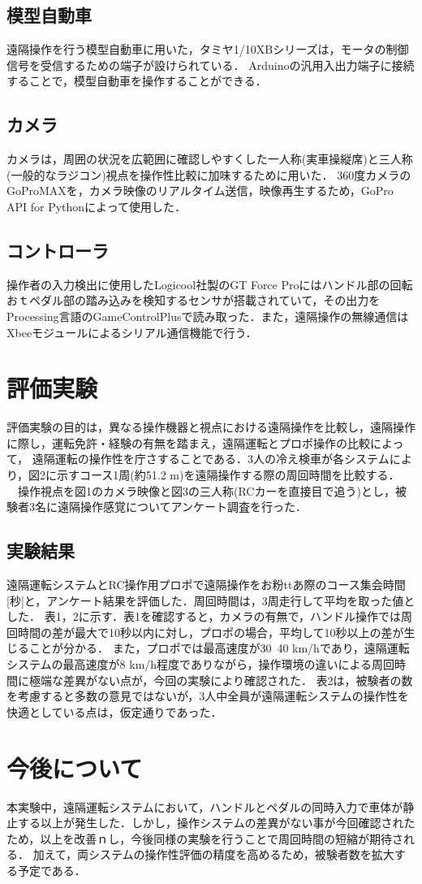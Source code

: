\documentclass[a4paper,10pt,twocolumn]{jsarticle}
\begin{document}
\subsection{模型自動車}
遠隔操作を行う模型自動車に用いた，タミヤ1/10XBシリーズは，モータの制御信号を受信するための端子が設けられている．
Arduinoの汎用入出力端子に接続することで，模型自動車を操作することができる．
\subsection{カメラ}
カメラは，周囲の状況を広範囲に確認しやすくした一人称(実車操縦席)と三人称(一般的なラジコン)視点を操作性比較に加味するために用いた．
360度カメラのGoProMAXを，カメラ映像のリアルタイム送信，映像再生するため，GoPro API for Pythonによって使用した．
\subsection{コントローラ}
操作者の入力検出に使用したLogicool社製のGT Force Proにはハンドル部の回転おｔペダル部の踏み込みを検知するセンサが搭載されていて，その出力を
Processing言語のGameControlPlusで読み取った．また，遠隔操作の無線通信はXbeeモジュールによるシリアル通信機能で行う．
\section{評価実験}
評価実験の目的は，異なる操作機器と視点における遠隔操作を比較し，遠隔操作に際し，運転免許・経験の有無を踏まえ，遠隔運転とプロポ操作の比較によって，
遠隔運転の操作性を庁さすることである．3人の冷え検車が各システムにより，図2に示すコース1周(約51.2 m)を遠隔操作する際の周回時間を比較する．
　操作視点を図1のカメラ映像と図3の三人称(RCカーを直接目で追う)とし，被験者3名に遠隔操作感覚についてアンケート調査を行った．
\subsection{実験結果}
遠隔運転システムとRC操作用プロポで遠隔操作をお粉ttあ際のコース集会時間[秒]と，アンケート結果を評価した．周回時間は，3周走行して平均を取った値とした．
表1，2に示す．表1を確認すると，カメラの有無で，ハンドル操作では周回時間の差が最大で10秒以内に対し，プロポの場合，平均して10秒以上の差が生じることが分かる．
また，プロポでは最高速度が30~40 km/hであり，遠隔運転システムの最高速度が8 km/h程度でありながら，操作環境の違いによる周回時間に極端な差異がない点が，今回の実験により確認された．
表2は，被験者の数を考慮すると多数の意見ではないが，3人中全員が遠隔運転システムの操作性を快適としている点は，仮定通りであった．
\section{今後について}
本実験中，遠隔運転システムにおいて，ハンドルとペダルの同時入力で車体が静止する以上が発生した．しかし，操作システムの差異がない事が今回確認されたため，以上を改善ｎし，今後同様の実験を行うことで周回時間の短縮が期待される．
加えて，両システムの操作性評価の精度を高めるため，被験者数を拡大する予定である．
\end{document}
